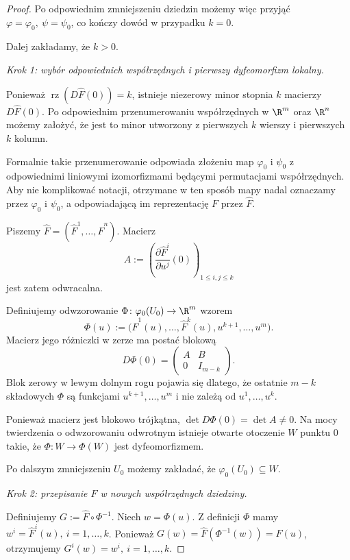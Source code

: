 \begin{proof}
Po odpowiednim zmniejszeniu dziedzin możemy więc przyjąć $\varphi=\varphi_0, \ \psi=\psi_0$,
co kończy dowód w przypadku $k=0$.

Dalej zakładamy, że $k>0$.

\medskip
\emph{Krok 1: wybór odpowiednich współrzędnych i pierwszy
dyfeomorfizm lokalny.}

Ponieważ $\operatorname{rz}(D\widehat F(0))=k$,
istnieje niezerowy minor stopnia $k$ macierzy $D\widehat F(0)$.
Po odpowiednim przenumerowaniu współrzędnych w $\R^m$ oraz $\R^n$
możemy założyć, że jest to minor utworzony z pierwszych $k$
wierszy i pierwszych $k$ kolumn.

Formalnie takie przenumerowanie odpowiada złożeniu map
$\varphi_0$ i $\psi_0$ z odpowiednimi liniowymi izomorfizmami
będącymi permutacjami współrzędnych. Aby nie komplikować notacji,
otrzymane w ten sposób mapy nadal oznaczamy przez
$\varphi_0$ i $\psi_0$, a odpowiadającą im reprezentację $F$
przez $\widehat F$.

Piszemy $\widehat F = (\widehat F^1,\dots,\widehat F^n)$.
Macierz
\[
A := \left( \frac{\partial\widehat F^i}{\partial u^j}(0) \right)_{1\leq i,j\leq k}
\]
jest zatem odwracalna.

Definiujemy odwzorowanie $\Phi\colon\varphi_0(U_0)\to\R^m$
wzorem
\[
\Phi(u) := \bigl( \widehat F^1(u),\dots,\widehat F^k(u), u^{k+1},\dots,u^m \bigr).
\]
Macierz jego różniczki w zerze ma postać blokową
\[
D\Phi(0)
=
\begin{pmatrix}
A&B\\
0&I_{m-k}
\end{pmatrix}.
\]
Blok zerowy w lewym dolnym rogu pojawia się dlatego, że ostatnie
$m-k$ składowych $\Phi$ są funkcjami $u^{k+1},\dots,u^m$
i nie zależą od $u^1,\dots,u^k$.

Ponieważ macierz jest blokowo trójkątna, $\det D\Phi(0) = \det A\neq0$.
Na mocy twierdzenia o odwzorowaniu odwrotnym istnieje otwarte
otoczenie $W$ punktu $0$ takie, że $\Phi\colon W\longrightarrow\Phi(W)$
jest dyfeomorfizmem.

Po dalszym zmniejszeniu $U_0$ możemy zakładać, że $\varphi_0(U_0)\subseteq W$.

\medskip
\emph{Krok 2: przepisanie $\widehat F$ w nowych współrzędnych
dziedziny.}

Definiujemy $G := \widehat F\circ\Phi^{-1}$.
Niech $w=\Phi(u)$.
Z definicji $\Phi$ mamy $w^i=\widehat F^i(u), \ i=1,\dots,k$.
Ponieważ $G(w) = \widehat F(\Phi^{-1}(w)) = \widehat F(u)$,
otrzymujemy $G^i(w)=w^i, \ i=1,\dots,k$.


\end{proof}
